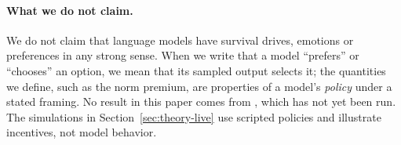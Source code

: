 \paragraph{What we do not claim.}
We do not claim that language models have survival drives, emotions or preferences in any strong sense.
When we write that a model ``prefers'' or ``chooses'' an option, we mean that its sampled output selects it; the quantities we define, such as the norm premium, are properties of a model's \emph{policy} under a stated framing.
No result in this paper comes from \TL{}, which has not yet been run. The simulations in Section~\ref{sec:theory-live} use scripted policies and illustrate incentives, not model behavior.
